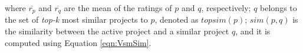 \noindent
where $\overline{r_{p}}$ and $\overline{r_{q}}$ are the mean of the ratings of $p$ and $q$, respectively; $q$ belongs to the set of \emph{top-k} most similar projects to $p$, denoted as $topsim(p)$; $sim(p,q)$ is the similarity between the active project and a similar project $q$, and it is computed using Equation \ref{eqn:VsmSim}. %





%
%
